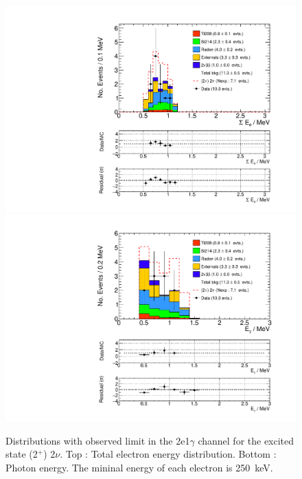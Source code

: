 \documentclass[main.tex]{subfiles}
\begin{document}
\begin{figure} [h!]
\begin{center}
\includegraphics[scale=0.5]{pictures/FinalResults/bb2nu2/250/SEe_bb2nu2.pdf}
\includegraphics[scale=0.5]{pictures/FinalResults/bb2nu2/250/Eg_bb2nu2.pdf}
\end{center}
\caption{Distributions with observed limit in the 2e1$\gamma$ channel for the excited state (2$^+$) 2$\nu$. Top : Total electron energy distribution. Bottom : Photon energy. The mininal energy of each electron is 250~keV.}
\label{plot:SEeAndEg250bb2nu2}
\end{figure}
\end{document}
